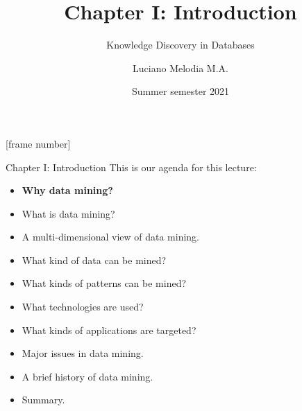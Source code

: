 \documentclass[aspectratio=169,t]{beamer}
\title[KDD]{Chapter I: Introduction}
\subtitle{Knowledge Discovery in Databases}
\author[L.~Melodia]{Luciano Melodia M.A.}
\institute[Department]{Evolutionary Data Management, Friedrich-Alexander University Erlangen-Nürnberg}
\date{Summer semester 2021}
\begin{document}
  \maketitle

  {
    [frame number]
    \begin{frame}{Chapter I: Introduction}
    This is our agenda for this lecture:
        \begin{itemize}
            \item \textbf{Why data mining?}
            \item What is data mining?
            \item A multi-dimensional view of data mining.
            \item What kind of data can be mined?
            \item What kinds of patterns can be mined?
            \item What technologies are used?
            \item What kinds of applications are targeted?
            \item Major issues in data mining.
            \item A brief history of data mining.
            \item Summary.
        \end{itemize}
    \end{frame}
  }
\end{document}
